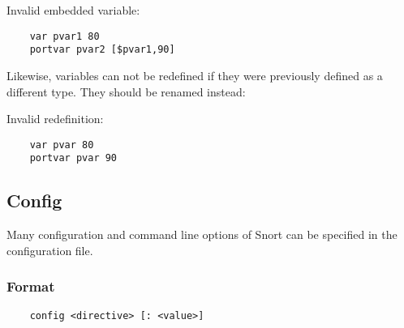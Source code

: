 \documentclass[english]{report}
\begin{document}
Invalid embedded variable:
        
\begin{verbatim}
    var pvar1 80
    portvar pvar2 [$pvar1,90]
\end{verbatim}

Likewise, variables can not be redefined if they were previously defined as a
different type.  They should be renamed instead:

Invalid redefinition:
        
\begin{verbatim}
    var pvar 80
    portvar pvar 90
\end{verbatim}

\subsection{Config}
\label{Config}

Many configuration and command line options of Snort can be specified in the
configuration file. 

\subsubsection{Format}

\begin{verbatim}
    config <directive> [: <value>]
\end{verbatim}
\end{document}
